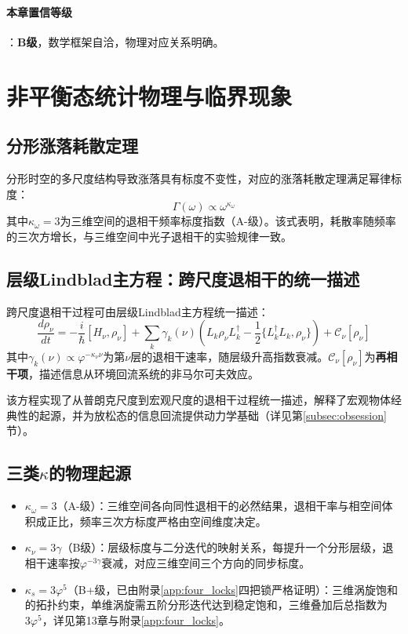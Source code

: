 \documentclass[12pt,a4paper,twocolumn]{article}
\renewcommand{\phi}{\varphi}
\begin{document}
\paragraph{本章置信等级}：\textbf{B级}，数学框架自洽，物理对应关系明确。

\section{非平衡态统计物理与临界现象}

\subsection{分形涨落耗散定理}
分形时空的多尺度结构导致涨落具有标度不变性，对应的涨落耗散定理满足幂律标度：
\[
\Gamma(\omega) \propto \omega^{\kappa_\omega}
\]
其中$\kappa_\omega = 3$为三维空间的退相干频率标度指数（A-级）。该式表明，耗散率随频率的三次方增长，与三维空间中光子退相干的实验规律一致。

\subsection{层级Lindblad主方程：跨尺度退相干的统一描述}
\label{subsec:lindblad}
跨尺度退相干过程可由层级Lindblad主方程统一描述：
\[
\frac{d\rho_\nu}{dt} = -\frac{i}{\hbar}[H_\nu,\rho_\nu] + \sum_k \gamma_k(\nu) \left( L_k \rho_\nu L_k^\dagger - \frac{1}{2}\{L_k^\dagger L_k, \rho_\nu\} \right) + \mathcal{C}_\nu[\rho_\nu]
\]
其中$\gamma_k(\nu) \propto \phi^{-\kappa_\nu \nu}$为第$\nu$层的退相干速率，随层级升高指数衰减。$\mathcal{C}_\nu[\rho_\nu]$为\textbf{再相干项}，描述信息从环境回流系统的非马尔可夫效应。

该方程实现了从普朗克尺度到宏观尺度的退相干过程统一描述，解释了宏观物体经典性的起源，并为放松态的信息回流提供动力学基础（详见第\ref{subsec:obsession}节）。

\subsection{三类$\kappa$的物理起源}
\begin{itemize}
\item $\kappa_\omega = 3$（A-级）：三维空间各向同性退相干的必然结果，退相干率与相空间体积成正比，频率三次方标度严格由空间维度决定。
\item $\kappa_\nu = 3\gamma$（B级）：层级标度与二分迭代的映射关系，每提升一个分形层级，退相干速率按$\phi^{-3\gamma}$衰减，对应三维空间三个方向的同步标度。
\item $\kappa_s = 3\phi^5$（B+级，已由附录\ref{app:four_locks}四把锁严格证明）：三维涡旋饱和的拓扑约束，单维涡旋需五阶分形迭代达到稳定饱和，三维叠加后总指数为$3\phi^5$，详见第13章与附录\ref{app:four_locks}。
\end{itemize}
\end{document}
